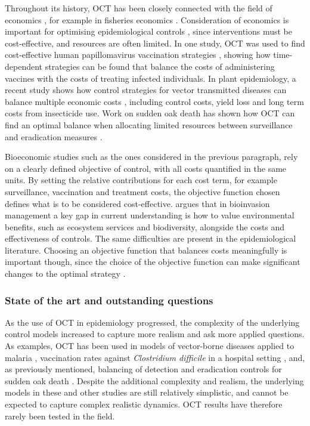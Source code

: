 Throughout its history, OCT has been closely connected with the field of economics \citep{weber_optimal_2011}, for example in fisheries economics \citep{clark_economics_1975}. Consideration of economics is important for optimising epidemiological controls \citep{perrings_merging_2014}, since interventions must be cost-effective, and resources are often limited. In one study, OCT was used to find cost-effective human papillomavirus vaccination strategies \citep{brown_role_2011}, showing how time-dependent strategies can be found that balance the costs of administering vaccines with the costs of treating infected individuals. In plant epidemiology, a recent study shows how control strategies for vector transmitted diseases can balance multiple economic costs \citep{bokil_optimal_2019}, including control costs, yield loss and long term costs from insecticide use. Work on sudden oak death has shown how OCT can find an optimal balance when allocating limited resources between surveillance and eradication measures \citep{ndeffo_mbah_balancing_2010}.

Bioeconomic studies such as the ones considered in the previous paragraph, rely on a clearly defined objective of control, with all costs quantified in the same units. By setting the relative contributions for each cost term, for example surveillance, vaccination and treatment costs, the objective function chosen defines what is to be considered cost-effective. \citet{epanchin-niell_economics_2017} argues that in bioinvasion management a key gap in current understanding is how to value environmental benefits, such as ecosystem services and biodiversity, alongside the costs and effectiveness of controls. The same difficulties are present in the epidemiological literature. Choosing an objective function that balances costs meaningfully is important though, since the choice of the objective function can make significant changes to the optimal strategy \citep{probert_decision_2016}.

\subsubsection{State of the art and outstanding questions}

As the use of OCT in epidemiology progressed, the complexity of the underlying control models increased to capture more realism and ask more applied questions. As examples, OCT has been used in models of vector-borne diseases applied to malaria \citep{blayneh_optimal_2009}, vaccination rates against \emph{Clostridium difficile} in a hospital setting \citep{stephenson_optimal_2017}, and, as previously mentioned, balancing of detection and eradication controls for sudden oak death \citep{ndeffo_mbah_balancing_2010}. Despite the additional complexity and realism, the underlying models in these and other studies are still relatively simplistic, and cannot be expected to capture complex realistic dynamics. OCT results have therefore rarely been tested in the field.


